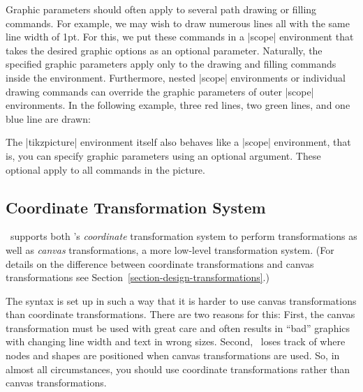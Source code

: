 Graphic parameters should often apply to several path drawing or filling
commands. For example, we may wish to draw numerous lines all with the same
line width of 1pt. For this, we put these commands in a |{scope}| environment
that takes the desired graphic options as an optional parameter. Naturally, the
specified graphic parameters apply only to the drawing and filling commands
inside the environment. Furthermore, nested |{scope}| environments or
individual drawing commands can override the graphic parameters of outer
|{scope}| environments. In the following example, three red lines, two green
lines, and one blue line are drawn:
%
\begin{codeexample}[]
\begin{tikzpicture}
  \begin{scope}[color=red]
    \draw (0mm,10mm) -- (10mm,10mm);
    \draw (0mm, 8mm) -- (10mm, 8mm);
    \draw (0mm, 6mm) -- (10mm, 6mm);
  \end{scope}
  \begin{scope}[color=green]
    \draw             (0mm, 4mm) -- (10mm, 4mm);
    \draw             (0mm, 2mm) -- (10mm, 2mm);
    \draw[color=blue] (0mm, 0mm) -- (10mm, 0mm);
  \end{scope}
\end{tikzpicture}
\end{codeexample}

The |{tikzpicture}| environment itself also behaves like a |{scope}|
environment, that is, you can specify graphic parameters using an optional
argument. These optional apply to all commands in the picture.


\subsection{Coordinate Transformation System}

\tikzname\ supports both \pgfname's \emph{coordinate} transformation system to
perform transformations as well as \emph{canvas} transformations, a more
low-level transformation system. (For details on the difference between
coordinate transformations and canvas transformations see
Section~\ref{section-design-transformations}.)

The syntax is set up in such a way that it is harder to use canvas
transformations than coordinate transformations. There are two reasons for
this: First, the canvas transformation must be used with great care and often
results in ``bad'' graphics with changing line width and text in wrong sizes.
Second, \pgfname\ loses track of where nodes and shapes are positioned when
canvas transformations are used. So, in almost all circumstances, you should
use coordinate transformations rather than canvas transformations.
